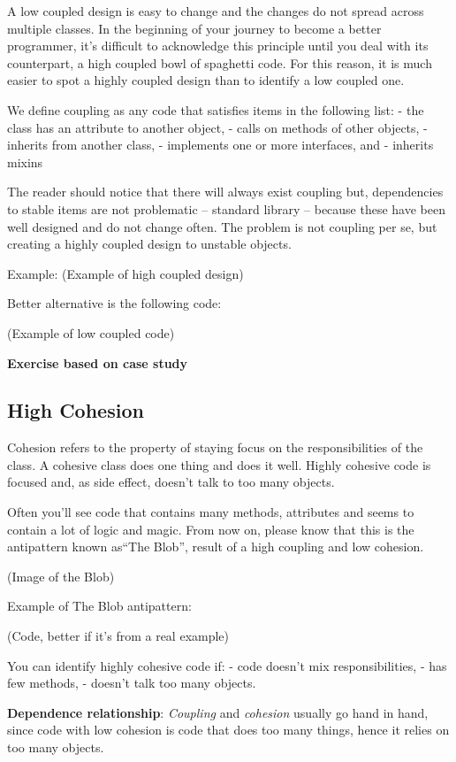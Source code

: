 \documentclass[]{article}
\begin{document}
A low coupled design is easy to change and the changes do not spread
across multiple classes. In the beginning of your journey to become a
better programmer, it's difficult to acknowledge this principle until
you deal with its counterpart, a high coupled bowl of spaghetti code.
For this reason, it is much easier to spot a highly coupled design than
to identify a low coupled one.

We define coupling as any code that satisfies items in the following
list: - the class has an attribute to another object, - calls on methods
of other objects, - inherits from another class, - implements one or
more interfaces, and - inherits mixins

The reader should notice that there will always exist coupling but,
dependencies to stable items are not problematic -- standard library --
because these have been well designed and do not change often. The
problem is not coupling per se, but creating a highly coupled design to
unstable objects.

Example: (Example of high coupled design)

Better alternative is the following code:

(Example of low coupled code)

\textbf{Exercise based on case study}

\subsection{High Cohesion}\label{high-cohesion}

Cohesion refers to the property of staying focus on the responsibilities
of the class. A cohesive class does one thing and does it well. Highly
cohesive code is focused and, as side effect, doesn't talk to too many
objects.

Often you'll see code that contains many methods, attributes and seems
to contain a lot of logic and magic. From now on, please know that this
is the antipattern known as``The Blob'', result of a high coupling and
low cohesion.

(Image of the Blob)

Example of The Blob antipattern:

(Code, better if it's from a real example)

You can identify highly cohesive code if: - code doesn't mix
responsibilities, - has few methods, - doesn't talk too many objects.

\textbf{Dependence relationship}: \emph{Coupling} and \emph{cohesion}
usually go hand in hand, since code with low cohesion is code that does
too many things, hence it relies on too many objects.
\end{document}
